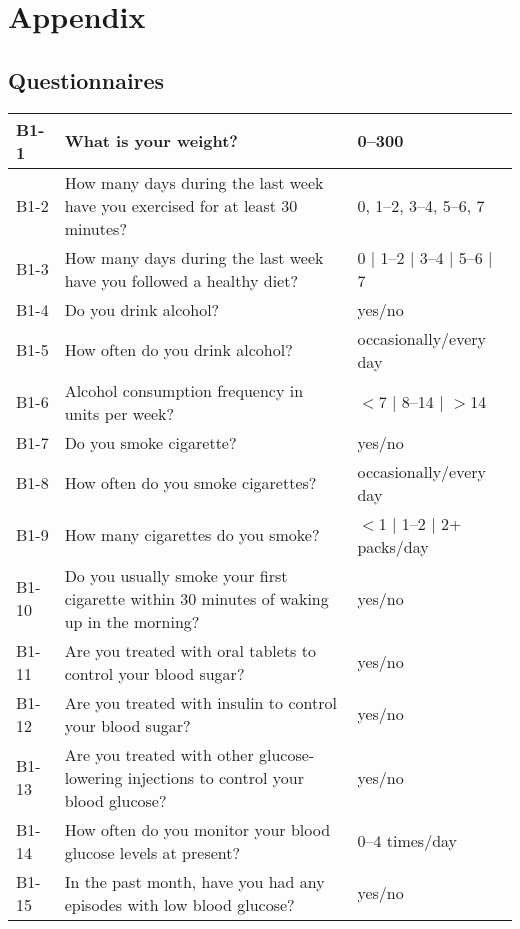 \section{Appendix}
\subsection{Questionnaires}
\begin{table}[H]
    \centering
    \begin{tabular}{|l|l|l|}
        \hline
        B1-1  & What is your weight? & 0--300
        \\ \hline
        B1-2  & How many days during the last week have you exercised for at least 30 minutes? & 0, 1--2, 3--4, 5--6, 7
        \\ \hline
        B1-3  & How many days during the last week have you followed a healthy diet? & 0 $\mid$ 1--2 $\mid$ 3--4 $\mid$ 5--6 $\mid$ 7
        \\ \hline
        B1-4  & Do you drink alcohol? & yes/no
        \\ \hline
        B1-5  & How often do you drink alcohol? & occasionally/every day
        \\ \hline
        B1-6  & Alcohol consumption frequency in units per week? & $<$7 $\mid$ 8--14 $\mid$ $>$14
        \\ \hline
        B1-7  & Do you smoke cigarette? & yes/no
        \\ \hline
        B1-8  & How often do you smoke cigarettes? & occasionally/every day
        \\ \hline
        B1-9  & How many cigarettes do you smoke? & $<$1 $\mid$ 1--2 $\mid$ 2+ packs/day
        \\ \hline
        B1-10 & Do you usually smoke your first cigarette within 30 minutes of waking up in the morning? & yes/no
        \\ \hline
        B1-11 & Are you treated with oral tablets to control your blood sugar? & yes/no
        \\ \hline
        B1-12 & Are you treated with insulin to control your blood sugar? & yes/no
        \\ \hline
        B1-13 & Are you treated with other glucose-lowering injections to control your blood glucose? & yes/no
        \\ \hline
        B1-14 & How often do you monitor your blood glucose levels at present? & 0--4 times/day
        \\ \hline
        B1-15 & In the past month, have you had any episodes with low blood glucose? & yes/no

\end{tabular}
\end{table}
